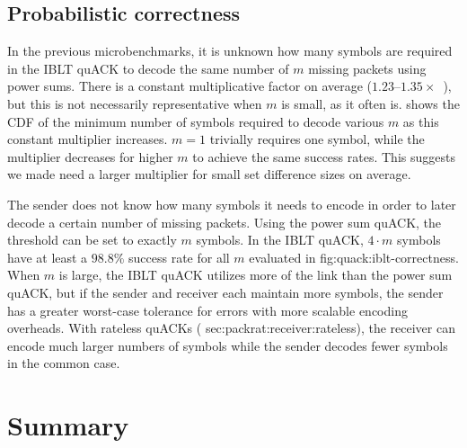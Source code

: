 \subsection{Probabilistic correctness}
\label{sec:quack:iblt-microbenchmarks:correctness}



In the previous microbenchmarks, it is unknown how many symbols are required in
the IBLT quACK to decode the same number of $m$ missing packets using power
sums. There is a constant multiplicative factor on average
($1.23$--$1.35\times$~\cite{yang2024practical,baek2023simple}), but this is
not necessarily representative when $m$ is small, as it often is.
 shows the CDF of the minimum number of symbols
required to decode various $m$ as this constant multiplier increases. $m=1$ trivially
requires one symbol, while the multiplier decreases for higher $m$ to achieve
the same success rates. This suggests we made need a larger multiplier for small
set difference sizes on average.

The sender does not know how many symbols it needs to encode in order to later
decode a certain number of missing packets. Using the power sum quACK, the
threshold can be set to exactly $m$ symbols. In the IBLT quACK, $4 \cdot m$
symbols have at least a $98.8\%$ success rate for all $m$ evaluated in \Cref
{fig:quack:iblt-correctness}. When $m$ is large, the IBLT quACK utilizes more
of the link than the power sum quACK, but if the sender and receiver each
maintain more symbols, the sender has a greater worst-case tolerance for
errors with more scalable encoding overheads. With rateless quACKs (\Cref
{sec:packrat:receiver:rateless}), the receiver can encode much larger numbers
of symbols while the sender decodes fewer symbols in the common case.



\section{Summary}
\label{sec:quack:summary}


